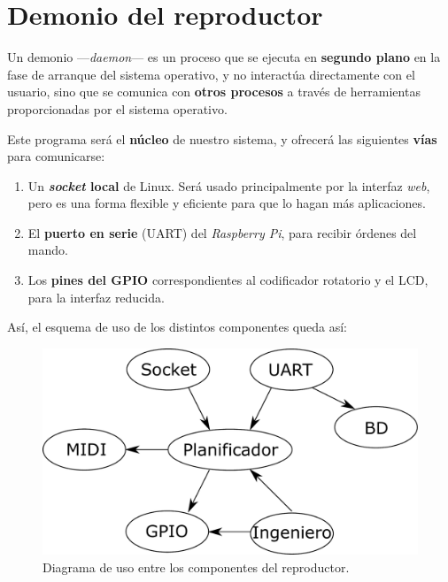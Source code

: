 \bigskip

\section{Demonio del reproductor}

Un demonio ---\textit{daemon}--- es un proceso que se ejecuta en \textbf{segundo plano} en la fase de arranque del sistema operativo, y no interactúa directamente con el usuario, sino que se comunica con \textbf{otros procesos} a través de herramientas proporcionadas por el sistema operativo. \cite{wiki_demonio}

Este programa será el \textbf{núcleo} de nuestro sistema, y ofrecerá las siguientes \textbf{vías} para comunicarse:

\begin{enumerate}
	\item Un \textbf{\textit{socket} local} de Linux. Será usado principalmente por la interfaz \textit{web}, pero es una forma flexible y eficiente para que lo hagan más aplicaciones.
	
	\item El \textbf{puerto en serie} (\acrshort{UART}) del \textit{Raspberry Pi}, para recibir órdenes del mando.
	
	\item Los \textbf{pines del \acrshort{GPIO}} correspondientes al codificador rotatorio y el \acrshort{LCD}, para la interfaz reducida.
\end{enumerate}

Así, el esquema de uso de los distintos componentes queda así:

\smallskip

\begin{figure}[H]
	\noindent \begin{centering}
		\includegraphics[width=\linewidth/2]{capitulo4/daemon}
		\par\end{centering}
	\smallskip
	\caption{\label{fig:daemon} Diagrama de uso entre los componentes del reproductor.}
\end{figure} 

